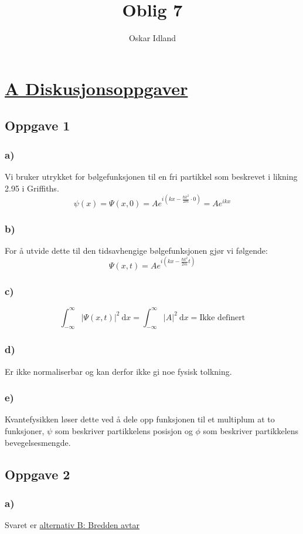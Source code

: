 \documentclass{article}
\author{Oskar Idland}
\title{Oblig 7}
\date{}
\begin{document}
\maketitle
\newpage

\section*{\underline{A Diskusjonsoppgaver}}
\subsection*{Oppgave 1}
\subsubsection*{a)}
Vi bruker utrykket for bølgefunksjonen til en fri partikkel som beskrevet i likning 2.95 i Griffiths.
\[
ψ(x) = Ψ(x,0) = Ae^{i\left(kx - \frac{ℏk^2}{2m} ⋅ 0\right)} = Ae^{ikx}
\]

\subsubsection*{b)}
For å utvide dette til den tidsavhengige bølgefunksjonen gjør vi følgende: 
\[
Ψ(x,t) = Ae^{i\left(kx - \frac{ℏk^2}{2m}t\right)}
\]

\subsubsection*{c)}
\[
∫_{-∞}^{∞} \left|Ψ(x,t)\right|^2 \ \mathrm{d}x = ∫_{-∞}^{∞} \left|A\right|^2 \ \mathrm{d}x = \text{Ikke definert}
\]

\subsubsection*{d)}
Er ikke normaliserbar og kan derfor ikke gi noe fysisk tolkning. 

\subsubsection*{e)}
Kvantefysikken løser dette ved å dele opp funksjonen til et multiplum at to funksjoner, $ψ$ som beskriver partikkelens posisjon og $ϕ$ som beskriver partikkelens bevegelsesmengde.

\subsection*{Oppgave 2}
\subsubsection*{a)}
Svaret er \underline{alternativ B: Bredden avtar}
\end{document}
